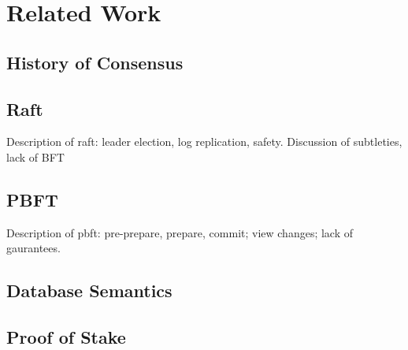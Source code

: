 \chapter{Related Work}

\section{History of Consensus}

\section{Raft}

Description of raft: leader election, log replication, safety.
Discussion of subtleties, lack of BFT

\section{PBFT}

Description of pbft: pre-prepare, prepare, commit; view changes; lack of gaurantees.

\section{Database Semantics}

\section{Proof of Stake}
